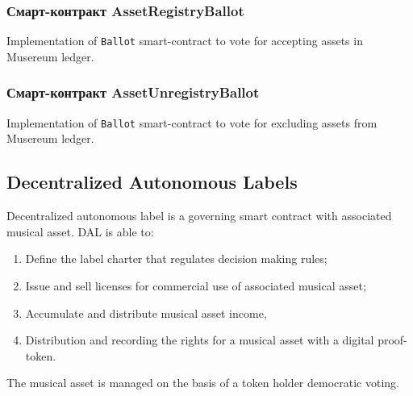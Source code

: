 \documentclass[12pt]{report}
\def\code#1{\colorbox{light-gray}{\texttt{#1}}}
\begin{document}
\subsubsection{Смарт-контракт AssetRegistryBallot}
\label{tech-apps-assets-regballot}
Implementation of \code{Ballot} smart-contract to vote for accepting assets in Musereum ledger.

\subsubsection{Смарт-контракт AssetUnregistryBallot}
\label{tech-apps-assets-unregballot}
Implementation of \code{Ballot} smart-contract to vote for excluding assets from Musereum ledger.

\subsection{Decentralized Autonomous Labels}
\label{tech-apps-dal}
Decentralized autonomous label is a governing smart contract with associated musical asset. DAL is able to:
\begin{enumerate}
	\item Define the label charter that regulates decision making rules;
	\item Issue and sell licenses for commercial use of associated musical asset;
	\item Accumulate and distribute musical asset income,
	\item Distribution and recording the rights for a musical asset with a digital proof-token.
\end{enumerate}

The musical asset is managed on the basis of a token holder democratic voting.
\end{document}
